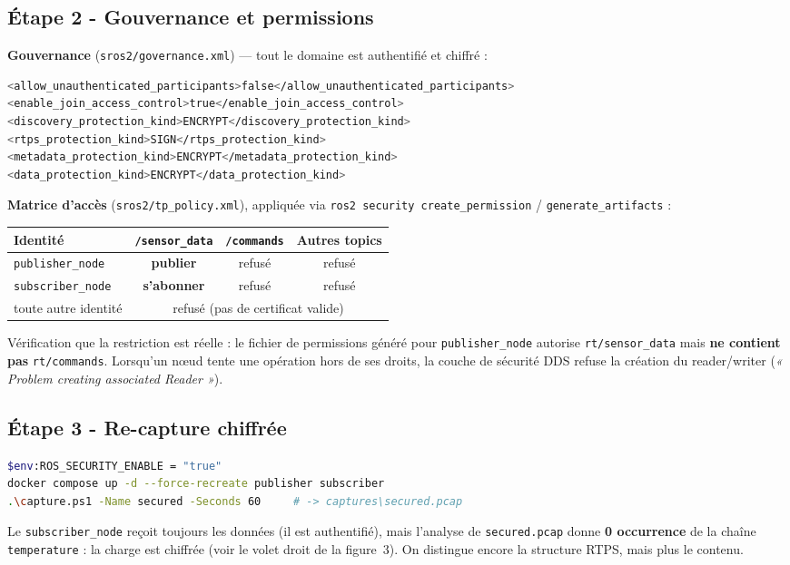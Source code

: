 \documentclass[11pt,a4paper]{article}
\newcommand{\cmd}[1]{\texttt{\small #1}}
\begin{document}
\subsection{Étape 2 - Gouvernance et permissions}
\textbf{Gouvernance} (\cmd{sros2/governance.xml}) — tout le domaine est
authentifié et chiffré :
\begin{lstlisting}[language=bash]
<allow_unauthenticated_participants>false</allow_unauthenticated_participants>
<enable_join_access_control>true</enable_join_access_control>
<discovery_protection_kind>ENCRYPT</discovery_protection_kind>
<rtps_protection_kind>SIGN</rtps_protection_kind>
<metadata_protection_kind>ENCRYPT</metadata_protection_kind>
<data_protection_kind>ENCRYPT</data_protection_kind>
\end{lstlisting}

\noindent\textbf{Matrice d'accès} (\cmd{sros2/tp\_policy.xml}), appliquée via
\cmd{ros2 security create\_permission} / \cmd{generate\_artifacts} :
\begin{center}\small
\begin{tabular}{@{}lccc@{}}
\toprule
Identité & \cmd{/sensor\_data} & \cmd{/commands} & Autres topics \\
\midrule
\cmd{publisher\_node}  & \textbf{publier}   & \textcolor{accent}{refusé} & refusé \\
\cmd{subscriber\_node} & \textbf{s'abonner} & \textcolor{accent}{refusé} & refusé \\
toute autre identité   & \multicolumn{3}{c}{\textcolor{accent}{refusé (pas de certificat valide)}} \\
\bottomrule
\end{tabular}
\end{center}
Vérification que la restriction est réelle : le fichier de permissions généré
pour \cmd{publisher\_node} autorise \cmd{rt/sensor\_data} mais \textbf{ne contient
pas} \cmd{rt/commands}. Lorsqu'un nœud tente une opération hors de ses droits, la
couche de sécurité DDS refuse la création du reader/writer
(\emph{« Problem creating associated Reader »}).

\subsection{Étape 3 - Re-capture chiffrée}
\begin{lstlisting}[language=bash]
$env:ROS_SECURITY_ENABLE = "true"
docker compose up -d --force-recreate publisher subscriber
.\capture.ps1 -Name secured -Seconds 60     # -> captures\secured.pcap
\end{lstlisting}
Le \cmd{subscriber\_node} reçoit toujours les données (il est authentifié), mais
l'analyse de \cmd{secured.pcap} donne \textbf{0 occurrence} de la chaîne
\cmd{temperature} : la charge est chiffrée (voir le volet droit de la figure~3).
On distingue encore la structure RTPS, mais plus le contenu.
\end{document}
